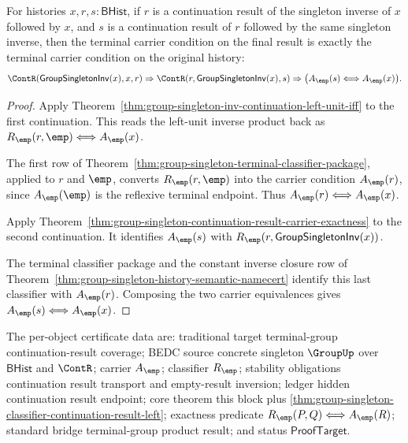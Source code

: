 \begin{theorem}
\label{thm:group-singleton-inverse-continuation-roundtrip-carrier-exactness}
For histories $x,r,s:\mathsf{BHist}$, if $r$ is a continuation result of the
singleton inverse of $x$ followed by $x$, and $s$ is a continuation result of
$r$ followed by the same singleton inverse, then the terminal carrier condition
on the final result is exactly the terminal carrier condition on the original
history:
$$
\ContR(\mathsf{GroupSingletonInv}(x),x,r)\Rightarrow
\ContR(r,\mathsf{GroupSingletonInv}(x),s)\Rightarrow
\bigl(A_{\emp}(s)\Longleftrightarrow A_{\emp}(x)\bigr).
$$
\end{theorem}
\begin{proof}
Apply Theorem~\ref{thm:group-singleton-inv-continuation-left-unit-iff} to the
first continuation. This reads the left-unit inverse product back as
$R_{\emp}(r,\emp)\Longleftrightarrow A_{\emp}(x)$.

The first row of
Theorem~\ref{thm:group-singleton-terminal-classifier-package}, applied to
$r$ and $\emp$, converts $R_{\emp}(r,\emp)$ into the carrier condition
$A_{\emp}(r)$, since $A_{\emp}(\emp)$ is the reflexive terminal endpoint.
Thus $A_{\emp}(r)\Longleftrightarrow A_{\emp}(x)$.

Apply Theorem~\ref{thm:group-singleton-continuation-result-carrier-exactness}
to the second continuation. It identifies $A_{\emp}(s)$ with
$R_{\emp}(r,\mathsf{GroupSingletonInv}(x))$.

The terminal classifier package and the constant inverse closure row of
Theorem~\ref{thm:group-singleton-history-semantic-namecert} identify this
last classifier with $A_{\emp}(r)$. Composing the two carrier equivalences
gives $A_{\emp}(s)\Longleftrightarrow A_{\emp}(x)$.
\end{proof}

The per-object certificate data are: traditional target terminal-group
continuation-result coverage; BEDC source concrete singleton $\GroupUp$ over
$\mathsf{BHist}$ and $\ContR$; carrier $A_{\emp}$; classifier $R_{\emp}$;
stability obligations continuation result transport and empty-result inversion;
ledger hidden continuation result endpoint; core theorem this block plus
\autoref{thm:group-singleton-classifier-continuation-result-left}; exactness
predicate $R_{\emp}(P,Q)\Longleftrightarrow A_{\emp}(R)$; standard bridge
terminal-group product result; and status $\mathsf{ProofTarget}$.

